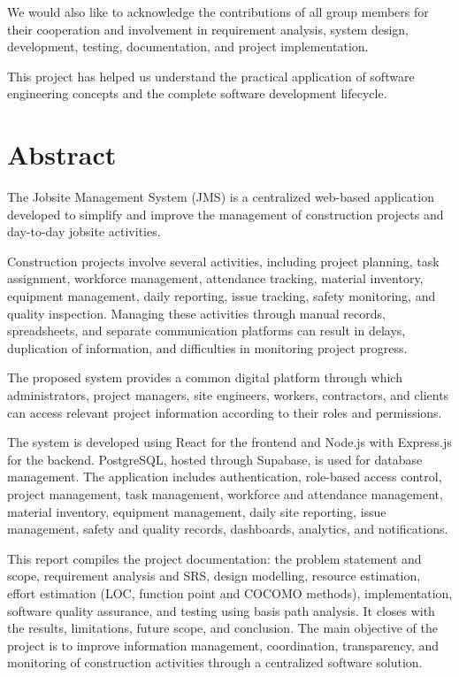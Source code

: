 \documentclass[11pt,a4paper]{article}
\begin{document}
We would also like to acknowledge the contributions of all group members for their cooperation and involvement in requirement analysis, system design, development, testing, documentation, and project implementation.

This project has helped us understand the practical application of software engineering concepts and the complete software development lifecycle.

\clearpage
\section*{Abstract}
The Jobsite Management System (JMS) is a centralized web-based application developed to simplify and improve the management of construction projects and day-to-day jobsite activities.

Construction projects involve several activities, including project planning, task assignment, workforce management, attendance tracking, material inventory, equipment management, daily reporting, issue tracking, safety monitoring, and quality inspection. Managing these activities through manual records, spreadsheets, and separate communication platforms can result in delays, duplication of information, and difficulties in monitoring project progress.

The proposed system provides a common digital platform through which administrators, project managers, site engineers, workers, contractors, and clients can access relevant project information according to their roles and permissions.

The system is developed using React for the frontend and Node.js with Express.js for the backend. PostgreSQL, hosted through Supabase, is used for database management. The application includes authentication, role-based access control, project management, task management, workforce and attendance management, material inventory, equipment management, daily site reporting, issue management, safety and quality records, dashboards, analytics, and notifications.

This report compiles the project documentation: the problem statement and scope, requirement analysis and SRS, design modelling, resource estimation, effort estimation (LOC, function point and COCOMO methods), implementation, software quality assurance, and testing using basis path analysis. It closes with the results, limitations, future scope, and conclusion. The main objective of the project is to improve information management, coordination, transparency, and monitoring of construction activities through a centralized software solution.
\end{document}
